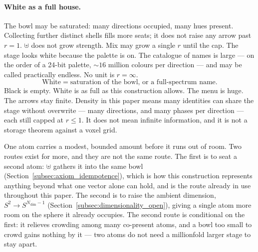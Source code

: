 \documentclass[12pt, a4paper]{article}
\begin{document}
\paragraph{White as a full house.}
The bowl may be saturated: many directions occupied, many hues present.
Collecting further distinct shells fills more seats; it does not raise
any arrow past $r=1$. $\uplus$ does not grow strength. Mix may grow a
single $r$ until the cap. The stage looks white because the palette is on. The catalogue
of names is large --- on the order of a 24-bit palette,
$\sim 16$ million colours per direction --- and may be called
practically endless. No unit is $r=\infty$.
\begin{equation}
    \text{White} \;=\; \text{saturation of the bowl, or a full-spectrum name.}
    \label{eq:white_state}
\end{equation}
Black is empty. White is as full as this construction allows. The
menu is huge. The arrows stay finite.
Density in this paper means many identities can share the stage
without overwrite --- many directions, and many phases per direction
--- each still capped at $r\le 1$. It does not mean infinite
information, and it is not a storage theorem against a voxel grid.

One atom carries a modest, bounded amount before it runs out of room.
Two routes exist for more, and they are not the same route. The first
is to seat a second atom: $\uplus$ gathers it into the same bowl
(Section~\ref{subsec:axiom_idempotence}), which is how this
construction represents anything beyond what one vector alone can
hold, and is the route already in use throughout this paper. The
second is to raise the ambient dimension, $S^2\to S^{N_{\mathrm{dim}}-1}$
(Section~\ref{subsec:dimensionality_open}), giving a single atom more room
on the sphere it already occupies. The second route is conditional on
the first: it relieves crowding among many co-present atoms, and a
bowl too small to crowd gains nothing by it --- two atoms do not
need a millionfold larger stage to stay apart.
\end{document}
